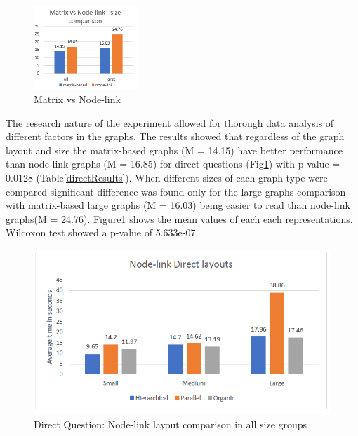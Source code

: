 \documentclass{l4proj}
\begin{document}
\begin{figure}
	\centering
	\vspace{-20mm}
    \includegraphics[width=0.35\textwidth]{images/directComparison.PNG}
    \caption{Matrix vs Node-link} 
	\label{directComparison}
\end{figure}


The research nature of the experiment allowed for thorough data analysis of different factors in the graphs. The results showed that regardless of the graph layout and size the matrix-based graphs (M = 14.15) have better performance than node-link graphs (M = 16.85) for direct questions (Fig\ref{directComparison}) with p-value = 0.0128 (Table\ref{directResults}). When different sizes of each graph type were compared significant difference was found only for the large graphs comparison with matrix-based large graphs (M = 16.03) being easier to read than node-link graphs(M = 24.76). Figure\ref{directComparison} shows the mean values of each each representations. Wilcoxon test showed a p-value of 5.633e-07.



\begin{figure}[!ht]
    \includegraphics[width=13cm]{images/nodelinkdirectlayouts.PNG}
    \vspace{-15pt}
    \centering
    \caption{Direct Question: Node-link layout comparison in all size groups}
	\label{nodelinkdirectlayouts}
\end{figure}
\end{document}
